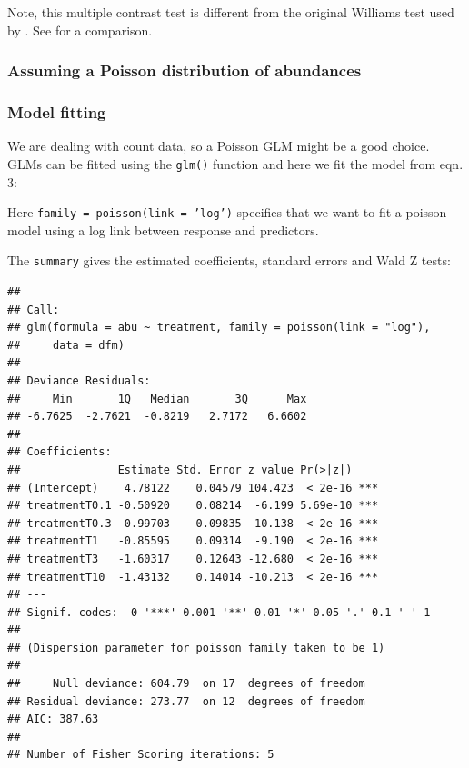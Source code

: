 Note, this multiple contrast test is different from the original Williams test \citep{williams_comparison_1972} used by \citep{brock_minimum_2015}. See \citet{bretz_powerful_1999} for a comparison.




\subsubsection{Assuming a Poisson distribution of abundances}
\subsubsection{Model fitting}
We are dealing with count data, so a Poisson GLM might be a good choice.
GLMs can be fitted using the \texttt{glm()} function and here we fit the model from eqn. 3:
\begin{knitrout}
\color{fgcolor}\begin{kframe}
\begin{alltt}
 \hlkwb{<-}  \hlopt{~}     \hlstd{=} \hlstd{(} \hlstd{=} \hlstd{))}
\end{alltt}
\end{kframe}
\end{knitrout}

Here \texttt{family = poisson(link = 'log')} specifies that we want to fit a poisson model using a log link between response and predictors.

The \texttt{summary} gives the estimated coefficients, standard errors and Wald Z tests:
\begin{knitrout}
\color{fgcolor}\begin{kframe}
\begin{alltt}
 \hlkwb{<-} 
\end{alltt}
\begin{verbatim}
## 
## Call:
## glm(formula = abu ~ treatment, family = poisson(link = "log"), 
##     data = dfm)
## 
## Deviance Residuals: 
##     Min       1Q   Median       3Q      Max  
## -6.7625  -2.7621  -0.8219   2.7172   6.6602  
## 
## Coefficients:
##               Estimate Std. Error z value Pr(>|z|)    
## (Intercept)    4.78122    0.04579 104.423  < 2e-16 ***
## treatmentT0.1 -0.50920    0.08214  -6.199 5.69e-10 ***
## treatmentT0.3 -0.99703    0.09835 -10.138  < 2e-16 ***
## treatmentT1   -0.85595    0.09314  -9.190  < 2e-16 ***
## treatmentT3   -1.60317    0.12643 -12.680  < 2e-16 ***
## treatmentT10  -1.43132    0.14014 -10.213  < 2e-16 ***
## ---
## Signif. codes:  0 '***' 0.001 '**' 0.01 '*' 0.05 '.' 0.1 ' ' 1
## 
## (Dispersion parameter for poisson family taken to be 1)
## 
##     Null deviance: 604.79  on 17  degrees of freedom
## Residual deviance: 273.77  on 12  degrees of freedom
## AIC: 387.63
## 
## Number of Fisher Scoring iterations: 5
\end{verbatim}
\end{kframe}
\end{knitrout}


